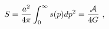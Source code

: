 \begin{equation}\label{3.32}
S={a^2 \over 4\pi} \int_0^\infty s(p) dp^2={{\cal A} \over 4G}~,
\end{equation}

